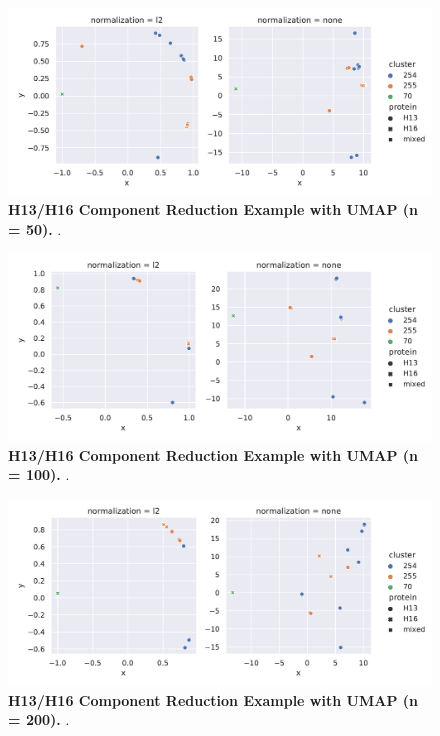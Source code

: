 \begin{figure}[!hbt]
    \includegraphics[width=\dimexpr\textwidth-2\fboxsep-2\fboxrule,fbox]{UMAP/Difference_Segment_4_H_UMAP_Neighbors_50.pdf}
    \caption[H13/H16 Component Reduction Example with \Acrshort{UMAP} (n = 50)]{\textbf{H13/H16 Component Reduction Example with \Acrshort{UMAP} (n = 50).} .}
    \label{fig:Reduction_Example_UMAP_50}
\end{figure}

\begin{figure}[!hbt]
    \includegraphics[width=\dimexpr\textwidth-2\fboxsep-2\fboxrule,fbox]{UMAP/Difference_Segment_4_H_UMAP_Neighbors_100.pdf}
    \caption[H13/H16 Component Reduction Example with \Acrshort{UMAP} (n = 100)]{\textbf{H13/H16 Component Reduction Example with \Acrshort{UMAP} (n = 100).} .}
    \label{fig:Reduction_Example_UMAP_100}
\end{figure}

\begin{figure}[!hbt]
    \includegraphics[width=\dimexpr\textwidth-2\fboxsep-2\fboxrule,fbox]{UMAP/Difference_Segment_4_H_UMAP_Neighbors_200.pdf}
    \caption[H13/H16 Component Reduction Example with \Acrshort{UMAP} (n = 200)]{\textbf{H13/H16 Component Reduction Example with \Acrshort{UMAP} (n = 200).} .}    \label{fig:Reduction_Example_UMAP_200}
\end{figure}